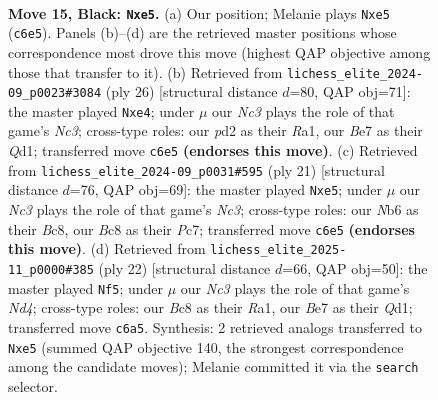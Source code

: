 \documentclass[11pt]{article}
\begin{document}
\clearpage

\begin{figure}[p]\centering
\begin{subfigure}{0.46\textwidth}\centering
\resizebox{\linewidth}{!}{%
\newchessgame
\chessboard[
  setfen={r1bqr1k1/pp2bppp/1nn1p3/4N3/2Pp2P1/1P5B/P2P1PKP/RNBQR3 b - - 5 15},
  showmover=false,
  pgfstyle=straightmove, color=movearrow, markmove={c6-e5}
]}
\caption{}
\end{subfigure}\hfill
\begin{subfigure}{0.46\textwidth}\centering
\resizebox{\linewidth}{!}{%
\newchessgame
\chessboard[
  setfen={r2qrbk1/ppp2ppp/2np4/7b/2PPn3/P1N1BN1P/1P2BPP1/R2QR1K1 w - - 1 14},
  showmover=false,
  pgfstyle=straightmove, color=movearrow, markmove={c3-e4}
]}
\caption{}
\end{subfigure}
\\[4pt]
\begin{subfigure}{0.46\textwidth}\centering
\resizebox{\linewidth}{!}{%
\newchessgame
\chessboard[
  setfen={r1bq1rk1/1pp1bppp/2n2n2/p3N3/2Pp4/P2P2P1/1P3PBP/RNBQR1K1 b - - 3 11},
  showmover=false,
  pgfstyle=straightmove, color=movearrow, markmove={c6-e5}
]}
\caption{}
\end{subfigure}\hfill
\begin{subfigure}{0.46\textwidth}\centering
\resizebox{\linewidth}{!}{%
\newchessgame
\chessboard[
  setfen={r1bqnrk1/ppp1bppp/4n3/P2pP3/3N4/2N2P2/1PP1B1PP/R1BQ1RK1 w - - 3 12},
  showmover=false,
  pgfstyle=straightmove, color=movearrow, markmove={d4-f5}
]}
\caption{}
\end{subfigure}
\caption{\textbf{Move 15, Black: \texttt{Nxe5}.} (a) Our position; Melanie plays \texttt{Nxe5} (\texttt{c6e5}). Panels (b)--(d) are the retrieved master positions whose correspondence most drove this move (highest QAP objective among those that transfer to it). (b) Retrieved from \texttt{lichess\_elite\_2024-09\_p0023\#3084} (ply 26) [structural distance $d$=80, QAP obj=71]: the master played \texttt{Nxe4}; under $\mu$ our \emph{Nc3} plays the role of that game's \emph{Nc3}; cross-type roles: our \emph{p}d2 as their \emph{R}a1, our \emph{B}e7 as their \emph{Q}d1; transferred move \texttt{c6e5} \textbf{(endorses this move)}. (c) Retrieved from \texttt{lichess\_elite\_2024-09\_p0031\#595} (ply 21) [structural distance $d$=76, QAP obj=69]: the master played \texttt{Nxe5}; under $\mu$ our \emph{Nc3} plays the role of that game's \emph{Nc3}; cross-type roles: our \emph{N}b6 as their \emph{B}c8, our \emph{B}c8 as their \emph{P}c7; transferred move \texttt{c6e5} \textbf{(endorses this move)}. (d) Retrieved from \texttt{lichess\_elite\_2025-11\_p0000\#385} (ply 22) [structural distance $d$=66, QAP obj=50]: the master played \texttt{Nf5}; under $\mu$ our \emph{Nc3} plays the role of that game's \emph{Nd4}; cross-type roles: our \emph{B}c8 as their \emph{R}a1, our \emph{B}e7 as their \emph{Q}d1; transferred move \texttt{c6a5}. Synthesis: 2 retrieved analogs transferred to \texttt{Nxe5} (summed QAP objective 140, the strongest correspondence among the candidate moves); Melanie committed it via the \texttt{search} selector.}
\label{fig:thought-m29}
\end{figure}
\end{document}
